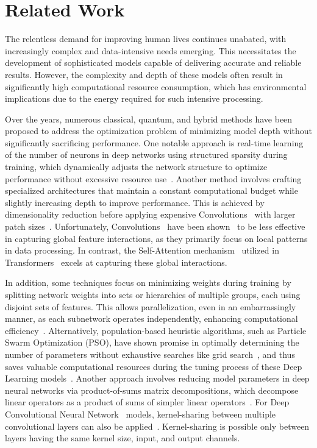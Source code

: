 \documentclass[12pt,a4paper]{report}
\begin{document}
\chapter{Related Work}\vspace{-12pt}
The relentless demand for improving human lives continues unabated, with increasingly complex and data-intensive needs emerging. This necessitates the development of sophisticated models capable of delivering accurate and reliable results. However, the complexity and depth of these models often result in significantly high computational resource consumption, which has environmental implications due to the energy required for such intensive processing.

Over the years, numerous classical, quantum, and hybrid methods have been proposed to address the optimization problem of minimizing model depth without significantly sacrificing performance. One notable approach is real-time learning of the number of neurons in deep networks using structured sparsity during training, which dynamically adjusts the network structure to optimize performance without excessive resource use~\cite{alvarez2018learning}. Another method involves crafting specialized architectures that maintain a constant computational budget while slightly increasing depth to improve performance. This is achieved by dimensionality reduction before applying expensive Convolutions~\cite{wen2021convolutional} with larger patch sizes~\cite{Szegedy_2015_CVPR}. Unfortunately, Convolutions~\cite{wen2021convolutional} have been shown~\cite{cordonnier2020relationship} to be less effective in capturing global feature interactions, as they primarily focus on local patterns in data processing. In contrast, the Self-Attention mechanism~\cite{voita2019analyzing} utilized in Transformers~\cite{vaswani2017attention} excels at capturing these global interactions.

In addition, some techniques focus on minimizing weights during training by splitting network weights into sets or hierarchies of multiple groups, each using disjoint sets of features. This allows parallelization, even in an embarrassingly manner, as each subnetwork operates independently, enhancing computational efficiency~\cite{pmlr-v70-kim17b}. Alternatively, population-based heuristic algorithms, such as Particle Swarm Optimization (PSO), have shown promise in optimally determining the number of parameters without exhaustive searches like grid search~\cite{liashchynskyi2019grid}, and thus saves valuable computational resources during the tuning process of these Deep Learning models~\cite{7986470}. Another approach involves reducing model parameters in deep neural networks via product-of-sums matrix decompositions, which decompose linear operators as a product of sums of simpler linear operators~\cite{wu2018prodsumnet}. For Deep Convolutional Neural Network~\cite{wen2021convolutional} models, kernel-sharing between multiple convolutional layers can also be applied~\cite{azadbakht2022drastically}. Kernel-sharing is possible only between layers having the same kernel size, input, and output channels.
\end{document}
